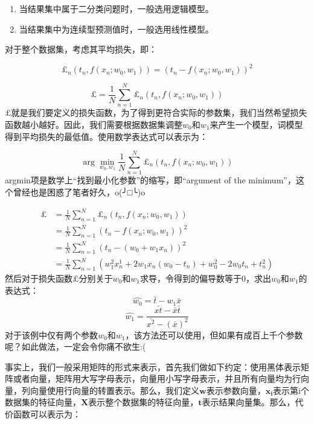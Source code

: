 \documentclass[a4paper, 11pt, UTF8]{ctexart} %
\begin{document}
\begin{enumerate}
\item 当结果集中属于二分类问题时，一般选用逻辑模型。
\item 当结果集中为连续型预测值时，一般选用线性模型。
\end{enumerate}

对于整个数据集，考虑其平均损失，即：

$$ \pounds_n(t_n, f(x_n; w_0, w_1)) = (t_n - f(x_n; w_0, w_1))^2 $$

$$ \pounds = \frac{1}{N} \sum_{n=1}^{N}{\pounds_n(t_n, f(x_n; w_0, w_1))}$$
$\pounds$就是我们要定义的损失函数，为了得到更符合实际的参数集，我们当然希望损失函数越小越好。因此，我们需要根据数据集调整$w_0$和$w_1$来产生一个模型，词模型得到平均损失的最低值。使用数学表达式可以表示为：

$$ \arg \min_{w_0,w_1}\frac{1}{N} \sum_{n=1}^{N}{\pounds_n(t_n, f(x_n; w_0, w_1))} $$
argmin项是数学上“找到最小化参数”的缩写，即“argument of the minimum”，这个曾经也是困惑了笔者好久，o(╯□╰)o

\begin{align*}
\pounds &= \frac{1}{N} \sum_{n=1}^{N}{\pounds_n(t_n, f(x_n; w_0, w_1))} \\
        &= \frac{1}{N} \sum_{n=1}^{N}{(t_n - f(x_n; w_0, w_1))}^2 \\
        &= \frac{1}{N} \sum_{n=1}^{N}{(t_n - (w_0 + w_1x_n))}^2 \\
        &= \frac{1}{N} \sum_{n=1}^{N}{(w_1^2x_n^1+2w_1x_n(w_0-t_n)+w_0^2-2w_0t_n+t_n^2)}
\end{align*}
然后对于损失函数$\pounds$分别关于$w_0$和$w_1$求导，令得到的偏导数等于0，求出$w_0$和$w_1$的表达式：
$$ \widehat{w_0} =  \bar{t} - w_1\bar{x}$$
$$ \widehat{w_1} = \frac{\bar{xt} - \bar{x}\bar{t}}{\bar{x^2} - (\bar{x})^2} $$
对于该例中仅有两个参数$w_0$和$w_1$，该方法还可以使用，但如果有成百上千个参数呢？如此做法，一定会令你痛不欲生:(

事实上，我们一般采用矩阵的形式来表示，首先我们做如下约定：使用黑体表示矩阵或者向量，矩阵用大写字母表示，向量用小写字母表示，并且所有向量均为行向量，列向量使用行向量的转置表示。那么，我们定义$\bm{w}$表示参数向量，$\bm{x_i}$表示第i个数据集的特征向量，$\bm{X}$表示整个数据集的特征向量，$\bm{t}$表示结果向量集。那么，代价函数可以表示为：
\end{document}
